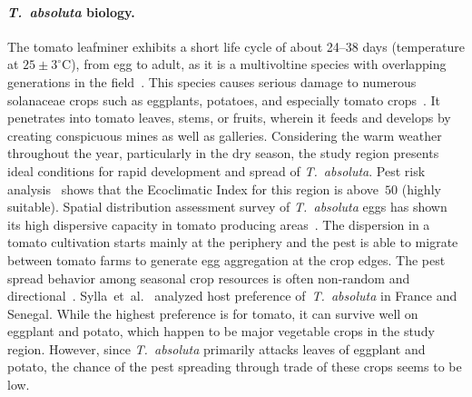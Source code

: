 \documentclass[11pt]{article}
\newcommand{\tuta}{\emph{T.~absoluta}}
\theoremstyle{definition}
\begin{document}
\paragraph{\tuta{} biology.}
The tomato leafminer exhibits a short life cycle of about 24--38 days
(temperature at $25\pm3^\circ$C), from egg to adult, as it is a
multivoltine species with overlapping generations in the
field~\cite{guedes2012tomato}. This species causes serious damage to
numerous solanaceae crops such as eggplants, potatoes, and especially
tomato crops~\cite{sylla2018}. It penetrates into tomato leaves, stems, or
fruits, wherein it feeds and develops by creating conspicuous mines as well
as galleries. Considering the warm weather throughout the year,
particularly in the dry season, the study region presents ideal conditions
for rapid development and spread of \tuta{}. Pest risk
analysis~\cite{tonnang2015identification} shows that the Ecoclimatic Index
for this region is above~$50$ (highly suitable). Spatial distribution
assessment survey of \tuta{} eggs has shown its high dispersive capacity in
tomato producing areas~\cite{martins2018assessing}. The dispersion in a
tomato cultivation starts mainly at the periphery and
the pest is able to migrate between tomato farms to generate egg aggregation at the
crop edges. The pest spread behavior among seasonal crop resources
is often non-random and directional~\cite{martins2018assessing}.
Sylla~et~al.~\cite{sylla2018} analyzed host preference of~\tuta{} in France
and Senegal. While the highest preference is for tomato, it can survive
well on eggplant and potato, which happen to be major vegetable crops in
the study region. However, since \tuta{} primarily attacks leaves of
eggplant and potato, the chance of the pest spreading through trade of
these crops seems to be low.

\end{document}
